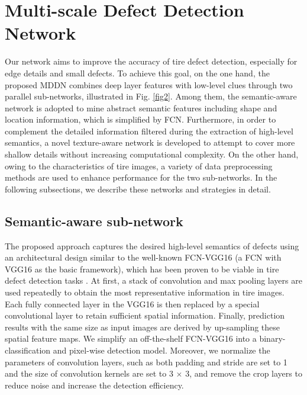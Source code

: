 \documentclass{article}
\begin{document}

\section{Multi-scale Defect Detection Network}
\label{sec:format}

Our network aims to improve the accuracy of tire defect detection, especially for edge details and small defects. To achieve this goal, on the one hand, the proposed MDDN combines deep layer features with low-level clues through two parallel sub-networks, illustrated in Fig. \ref{fig2}. Among them, the semantic-aware network is adopted to mine abstract semantic features including shape and location information, which is simplified by FCN. Furthermore, in order to complement the detailed information filtered during the extraction of high-level semantics, a novel texture-aware network is developed to attempt to cover more shallow details without increasing computational complexity. On the other hand, owing to the characteristics of tire images, a variety of data preprocessing methods are used to enhance performance for the two sub-networks. In the following subsections, we describe these networks and strategies in detail.

\subsection{Semantic-aware sub-network}
\label{Semantic-aware sub-network}
The proposed approach captures the desired high-level semantics of defects using an architectural design similar to the well-known FCN-VGG16 (a FCN with VGG16 as the basic framework), which has been proven to be viable in tire defect detection tasks \cite{wang2019tire}. At first, a stack of convolution and max pooling layers are used repeatedly to obtain the most representative information in tire images. Each fully connected layer in the VGG16 is then replaced by a special convolutional layer to retain sufficient spatial information. Finally, prediction results with the same size as input images are derived by up-sampling these spatial feature maps. We simplify an off-the-shelf FCN-VGG16 into a binary-classification and pixel-wise detection model. Moreover, we normalize the parameters of convolution layers, such as both padding and stride are set to 1 and the size of convolution kernels are set to 3 $\times$ 3, and remove the crop layers to reduce noise and increase the detection efficiency.
\end{document}
